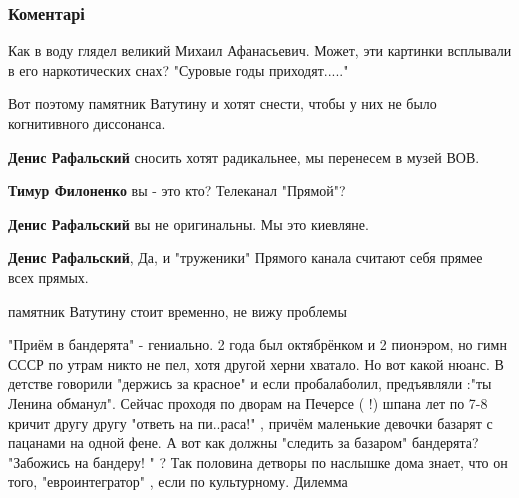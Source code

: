  
 
 
 
 
\subsubsection{Коментарі}

\begin{itemize} %
Как в воду глядел великий Михаил Афанасьевич. Может, эти картинки всплывали в его наркотических снах? "Суровые годы приходят....."

Вот поэтому памятник Ватутину и хотят снести, чтобы у них не было когнитивного диссонанса.

\begin{itemize} %
\textbf{Денис Рафальский} сносить хотят радикальнее, мы перенесем в музей ВОВ.

\textbf{Тимур Филоненко} вы - это кто? Телеканал "Прямой"?

\textbf{Денис Рафальский} вы не оригинальны. Мы это киевляне.

\textbf{Денис Рафальский}, Да, и "труженики" Прямого канала считают себя прямее всех прямых.
\end{itemize} %

памятник Ватутину стоит временно, не вижу проблемы


"Приём в бандерята" - гениально. 2 года был октябрёнком и 2 пионэром, но гимн
СССР по утрам никто не пел, хотя другой херни хватало. Но вот какой нюанс. В
детстве говорили "держись за красное" и если пробалаболил, предъявляли :"ты
Ленина обманул". Сейчас проходя по дворам на Печерсе ( !) шпана лет по 7-8
кричит другу другу "ответь на пи..раса!" , причём маленькие девочки базарят с
пацанами на одной фене. А вот как должны "следить за базаром" бандерята?
"Забожись на бандеру! " ? Так половина детворы по наслышке дома знает, что он
того, "евроинтегратор" , если по культурному. Дилемма



\end{itemize}
